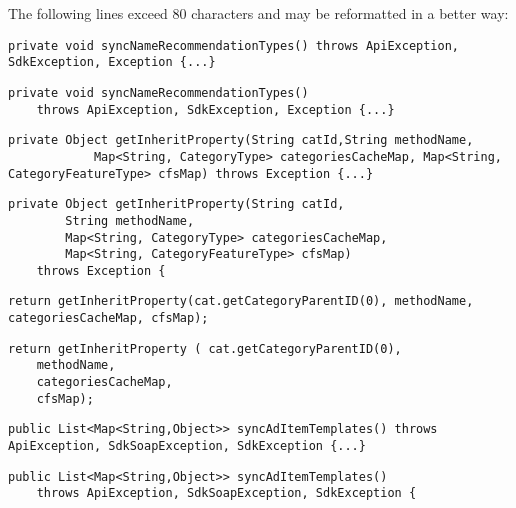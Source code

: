 The following lines exceed 80 characters and may be reformatted in a better way:
\begin{lstlisting}[firstnumber=99, caption={Line 99 violation of the rule}]
private void syncNameRecommendationTypes() throws ApiException, SdkException, Exception {...}
\end{lstlisting}
\begin{lstlisting}[firstnumber=99, caption={Line 99 possible solution}]
private void syncNameRecommendationTypes()
	throws ApiException, SdkException, Exception {...}
\end{lstlisting}
\noindent\makebox[\linewidth]{\rule{\linewidth}{0.4pt}}
\begin{lstlisting}[firstnumber=181, caption={Line 181 violation of the rule}]
private Object getInheritProperty(String catId,String methodName,
            Map<String, CategoryType> categoriesCacheMap, Map<String, CategoryFeatureType> cfsMap) throws Exception {...}
\end{lstlisting}
\begin{lstlisting}[firstnumber=181, caption={Line 181 possible solution}]
private Object getInheritProperty(String catId,
        String methodName,
        Map<String, CategoryType> categoriesCacheMap,
        Map<String, CategoryFeatureType> cfsMap)
    throws Exception {
\end{lstlisting}
\noindent\makebox[\linewidth]{\rule{\linewidth}{0.4pt}}
\begin{lstlisting}[firstnumber=199, caption={Line 199 violation of the rule}]
return getInheritProperty(cat.getCategoryParentID(0), methodName, categoriesCacheMap, cfsMap);
\end{lstlisting}
\begin{lstlisting}[firstnumber=199, caption={Line 199 possible solution}]
return getInheritProperty ( cat.getCategoryParentID(0),
    methodName,
    categoriesCacheMap,
    cfsMap);
\end{lstlisting}
\noindent\makebox[\linewidth]{\rule{\linewidth}{0.4pt}}
\begin{lstlisting}[firstnumber=221, caption={Line 221 violation of the rule}]
public List<Map<String,Object>> syncAdItemTemplates() throws ApiException, SdkSoapException, SdkException {...}
\end{lstlisting}
\begin{lstlisting}[firstnumber=221, caption={Line 221 possible solution}]
public List<Map<String,Object>> syncAdItemTemplates()
	throws ApiException, SdkSoapException, SdkException {
\end{lstlisting}




